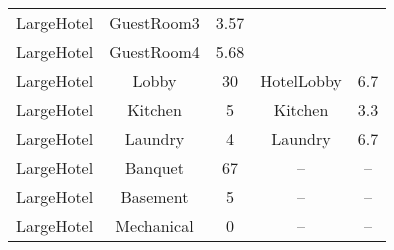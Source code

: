 \begin{table}
\begin{tabular}{|c|c|c|c|c|}
LargeHotel             & GuestRoom3              & 3.57                                                                                                          &                                   &                                                                                                                \\ \cline{1-3}
LargeHotel             & GuestRoom4              & 5.68                                                                                                          &                                   &                                                                                                                \\ \hline
LargeHotel             & Lobby                   & 30                                                                                                            & HotelLobby                        & 6.7                                                                                                            \\ \hline
LargeHotel             & Kitchen                 & 5                                                                                                             & Kitchen                           & 3.3                                                                                                            \\ \hline
LargeHotel             & Laundry                 & 4                                                                                                             & Laundry                           & 6.7                                                                                                            \\ \hline
LargeHotel             & Banquet                 & 67                                                                                                            & --                                & --                                                                                                             \\ \hline
LargeHotel             & Basement                & 5                                                                                                             & --                                & --                                                                                                             \\ \hline
LargeHotel             & Mechanical              & 0                                                                                                             & --                                & --                                                                                                             \\ \hline

\end{tabular}
\end{table}
